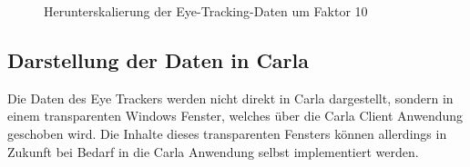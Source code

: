 \begin{figure}[h]
    \begin{center}
    \caption{Herunterskalierung der Eye-Tracking-Daten um Faktor 10}\label{fig:scale}
    \end{center}
    
\end{figure}


\subsection{Darstellung der Daten in Carla}
Die Daten des Eye Trackers werden nicht direkt in Carla dargestellt, sondern in einem transparenten Windows Fenster, welches über die Carla Client Anwendung geschoben wird. Die Inhalte dieses transparenten Fensters können allerdings in Zukunft bei Bedarf in die Carla Anwendung selbst implementiert werden.

